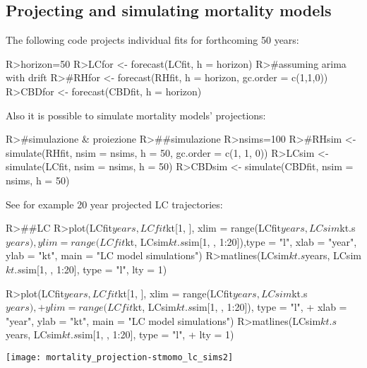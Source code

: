 \documentclass[nojss]{jss}
\begin{document}
\subsection{Projecting and simulating mortality models}

The following code projects individual fits for forthcoming 50 years:

\begin{Schunk}
\begin{Sinput}
R>horizon=50
R>LCfor <- forecast(LCfit, h = horizon)
R>#assuming arima with drift
R>#RHfor <- forecast(RHfit, h = horizon, gc.order = c(1,1,0))
R>CBDfor <- forecast(CBDfit, h = horizon)
\end{Sinput}
\end{Schunk}

Also it is possible to simulate mortality models' projections:

\begin{Schunk}
\begin{Sinput}
R>#simulazione & proiezione
R>##simulazione
R>nsims=100
R>#RHsim <- simulate(RHfit, nsim = nsims, h = 50, gc.order = c(1, 1, 0))
R>LCsim <- simulate(LCfit, nsim = nsims, h = 50)
R>CBDsim <- simulate(CBDfit, nsim = nsims, h = 50)
\end{Sinput}
\end{Schunk}


See for example 20 year projected LC trajectories:

\begin{Schunk}
\begin{Sinput}
R>##LC
R>plot(LCfit$years, LCfit$kt[1, ], xlim = range(LCfit$years, LCsim$kt.s$years), ylim = range(LCfit$kt, LCsim$kt.s$sim[1, , 1:20]),type = "l", xlab = "year", ylab = "kt", main = "LC model simulations")
R>matlines(LCsim$kt.s$years, LCsim$kt.s$sim[1, , 1:20], type = "l", lty = 1)
\end{Sinput}
\end{Schunk}

\begin{Schunk}
\begin{Sinput}
R>plot(LCfit$years, LCfit$kt[1, ], xlim = range(LCfit$years, LCsim$kt.s$years), 
+     ylim = range(LCfit$kt, LCsim$kt.s$sim[1, , 1:20]), type = "l", 
+     xlab = "year", ylab = "kt", main = "LC model simulations")
R>matlines(LCsim$kt.s$years, LCsim$kt.s$sim[1, , 1:20], type = "l", 
+     lty = 1)
\end{Sinput}
\end{Schunk}
\texttt{[image: mortality\_projection-stmomo\_lc\_sims2]}
\end{document}
